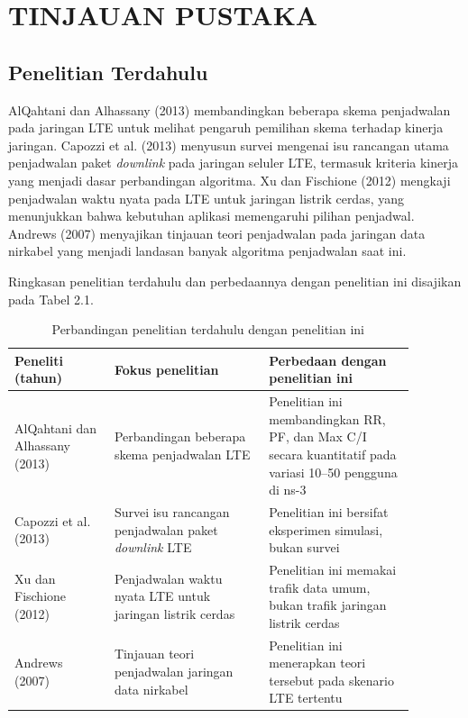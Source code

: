 \chapter{TINJAUAN PUSTAKA}

\section{Penelitian Terdahulu}
AlQahtani dan Alhassany (2013) membandingkan beberapa skema penjadwalan pada jaringan LTE untuk melihat pengaruh pemilihan skema terhadap kinerja jaringan. Capozzi et al. (2013) menyusun survei mengenai isu rancangan utama penjadwalan paket \textit{downlink} pada jaringan seluler LTE, termasuk kriteria kinerja yang menjadi dasar perbandingan algoritma. Xu dan Fischione (2012) mengkaji penjadwalan waktu nyata pada LTE untuk jaringan listrik cerdas, yang menunjukkan bahwa kebutuhan aplikasi memengaruhi pilihan penjadwal. Andrews (2007) menyajikan tinjauan teori penjadwalan pada jaringan data nirkabel yang menjadi landasan banyak algoritma penjadwalan saat ini.

\needspace{9cm}
Ringkasan penelitian terdahulu dan perbedaannya dengan penelitian ini disajikan pada Tabel 2.1.

\begin{singlespace}
\begin{longtable}{|p{0.22\linewidth}|p{0.34\linewidth}|p{0.32\linewidth}|}
\caption{Perbandingan penelitian terdahulu dengan penelitian ini}\\
\hline
\textbf{Peneliti (tahun)} & \textbf{Fokus penelitian} & \textbf{Perbedaan dengan penelitian ini} \\
\hline
AlQahtani dan Alhassany (2013) & Perbandingan beberapa skema penjadwalan LTE & Penelitian ini membandingkan RR, PF, dan Max C/I secara kuantitatif pada variasi 10--50 pengguna di ns-3 \\
\hline
Capozzi et al. (2013) & Survei isu rancangan penjadwalan paket \textit{downlink} LTE & Penelitian ini bersifat eksperimen simulasi, bukan survei \\
\hline
Xu dan Fischione (2012) & Penjadwalan waktu nyata LTE untuk jaringan listrik cerdas & Penelitian ini memakai trafik data umum, bukan trafik jaringan listrik cerdas \\
\hline
Andrews (2007) & Tinjauan teori penjadwalan jaringan data nirkabel & Penelitian ini menerapkan teori tersebut pada skenario LTE tertentu \\
\hline
\end{longtable}
\end{singlespace}

